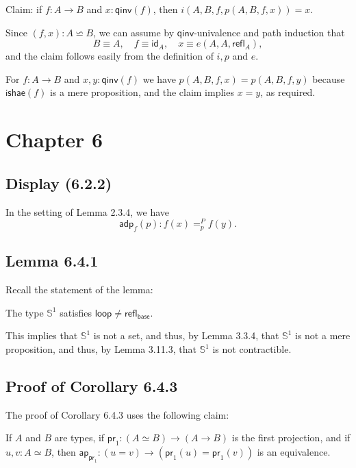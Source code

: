 \documentclass[12pt]{article}
\newcommand{\mbb}{\mathbb}
\newcommand{\msf}{\mathsf}
\newcommand{\nn}{\noindent}
\newcommand{\pr}{\mathsf{pr}}
\newcommand{\refl}{\mathsf{refl}}
\begin{document}
Claim: if $f:A\to B$ and $x:\mathsf{qinv}(f)$, then $i(A,B,f,p(A,B,f,x))=x$.
 
Since $(f,x):A\backsimeq B$, we can assume by $\mathsf{qinv}$-univalence and path induction that 
$$
B\equiv A,\quad f\equiv\mathsf{id}_A,\quad x\equiv e(A,A,\mathsf{refl}_A),
$$ 
and the claim follows easily from the definition of $i,p$ and $e$.

For $f:A\to B$ and $x,y:\mathsf{qinv}(f)$ we have $p(A,B,f,x)=p(A,B,f,y)$ because $\mathsf{ishae}(f)$ is a mere proposition, and the claim implies $x=y$, as required.


\section{Chapter 6}

\subsection{Display (6.2.2)}

In the setting of Lemma 2.3.4, we have 
$$
\msf{adp}_f(p):f(x)=^P_pf(y).
$$


\subsection{Lemma 6.4.1}

Recall the statement of the lemma:

The type $\mbb S^1$ satisfies $\msf{loop}\neq\refl_{\msf{base}}$. 

This implies that $\mbb S^1$ is not a set, and thus, by Lemma 3.3.4, that $\mbb S^1$ is not a mere proposition, and thus, by Lemma 3.11.3, that $\mbb S^1$ is not contractible.


\subsection{Proof of Corollary 6.4.3} %


The proof of Corollary 6.4.3 uses the following claim:

\nn If $A$ and $B$ are types, if $\pr_1:(A\simeq B)\to(A\to B)$ is the first projection, and if $u,v:A\simeq B$, then $\msf{ap}_{\pr_1}:(u=v)\to(\pr_1(u)=\pr_1(v))$ is an equivalence.
\end{document}
